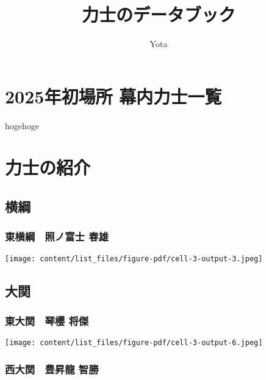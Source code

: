 \documentclass[
  letterpaper,
]{bxjsbook}
\title{力士のデータブック}
\author{Yota}
\date{}
\renewcommand*\contentsname{Table of contents}
\newcommand\contentsname{Table of contents}
\begin{document}
\maketitle

\renewcommand*\contentsname{Table of contents}
{
\hypersetup{linkcolor=}
\setcounter{tocdepth}{2}
\tableofcontents
}


\chapter{2025年初場所
幕内力士一覧}\label{ux5e74ux521dux5834ux6240-ux5e55ux5185ux529bux58ebux4e00ux89a7}

hogehoge


\chapter{力士の紹介}\label{ux529bux58ebux306eux7d39ux4ecb}

\section{横綱}\label{ux6a2aux7db1}

\subsection{東横綱　照ノ富士
春雄}\label{ux6771ux6a2aux7db1-ux7167ux30ceux5bccux58eb-ux6625ux96c4}

\texttt{[image: content/list\_files/figure-pdf/cell-3-output-3.jpeg]}

\section{大関}\label{ux5927ux95a2}

\subsection{東大関　琴櫻
将傑}\label{ux6771ux5927ux95a2-ux7434ux6afb-ux5c06ux5091}

\texttt{[image: content/list\_files/figure-pdf/cell-3-output-6.jpeg]}

\subsection{西大関　豊昇龍
智勝}\label{ux897fux5927ux95a2-ux8c4aux6607ux9f8d-ux667aux52dd}
\end{document}
